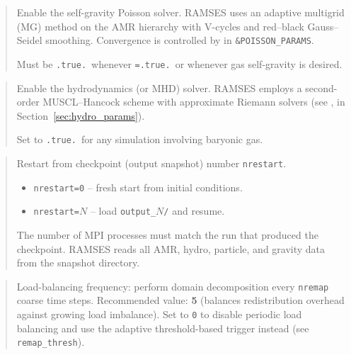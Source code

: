 \begin{quote}
Enable the self-gravity Poisson solver.  RAMSES uses an adaptive
multigrid (MG) method on the AMR hierarchy with V-cycles and
red--black Gauss--Seidel smoothing.  Convergence is controlled by
 in \texttt{\&POISSON\_PARAMS}.

Must be \texttt{.true.}\ whenever \texttt{=.true.}\ or
whenever gas self-gravity is desired.
\end{quote}

\label{param:hydro}

\begin{quote}
Enable the hydrodynamics (or MHD) solver.  RAMSES employs a
second-order MUSCL--Hancock scheme with approximate Riemann solvers
(see ,  in
Section~\ref{sec:hydro_params}).

Set to \texttt{.true.}\ for any simulation involving baryonic gas.
\end{quote}

\label{param:nrestart}

\begin{quote}
Restart from checkpoint (output snapshot) number \texttt{nrestart}.
\begin{itemize}[nosep]
  \item \texttt{nrestart=0} -- fresh start from initial conditions.
  \item \texttt{nrestart=}$N$ -- load \texttt{output\_}$N$\texttt{/} and resume.
\end{itemize}
The number of MPI processes must match the run that produced the
checkpoint.  RAMSES reads all AMR, hydro, particle, and gravity data
from the snapshot directory.
\end{quote}

\label{param:nremap}

\begin{quote}
Load-balancing frequency: perform domain decomposition every
\texttt{nremap} coarse time steps.  Recommended value: \textbf{5}
(balances redistribution overhead against growing load imbalance).
Set to \texttt{0} to disable periodic load balancing and use
the adaptive threshold-based trigger instead (see
\texttt{remap\_thresh}).

\end{quote}

